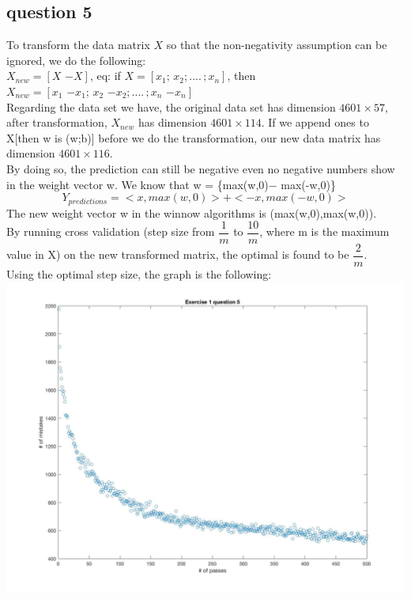 \documentclass[11pt]{article} %
\begin{document}
\subsection{question 5}
To transform the data matrix $X$ so that the non-negativity assumption can be ignored, we do the following: \\
$X_{new} = [X\,\,{-X}]$, eq: if $X = [x_{1};\,x_{2};....\,;x_{n}]$, then $X_{new} = [x_{1}\,\,{-x_{1}}; \,x_{2}\,\,{-x_{2}};....\,;x_{n}\,\,{-x_{n}}]$\\ 
Regarding the data set we have, the original data set has dimension $4601\times57$, after transformation, $X_{new}$ has dimension $4601\times114$. If we append ones to X[then w is (w;b)] before we do the transformation, our new data matrix has dimension $4601\times116$.\\
By doing so, the prediction can still be negative even no negative numbers show in the weight vector w. We know that w = \{max(w,0)$-$ max(-w,0)\}
\begin{equation}
Y_{predictions} = <x,max(w,0)> + <-x,max(-w,0)>
\end{equation}
The new weight vector w in the winnow algorithms is (max(w,0),max(w,0)).\\
By running cross validation (step size from $\dfrac{1}{m}$ to $\dfrac{10}{m}$, where m is the maximum value in X) on the new transformed matrix, the optimal is found to be $\dfrac{2}{m}$.\\
Using the optimal step size, the graph is the following:\\
\includegraphics[scale=0.3]{e1q5.jpg}
\end{document}
